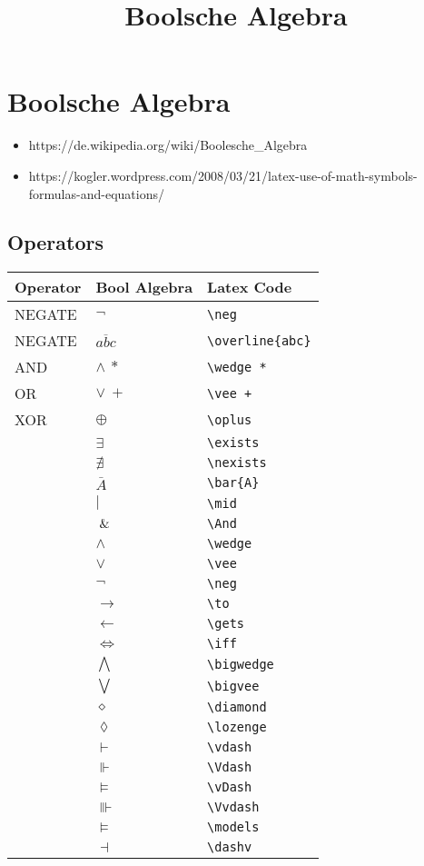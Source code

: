 \documentclass[11pt]{article}
\title{Boolsche Algebra}
\providecommand{\tightlist}{%
      \setlength{\itemsep}{0pt}\setlength{\parskip}{0pt}}
\begin{document}
    
    
    \maketitle
    
    

    
    \section{Boolsche Algebra}\label{boolsche-algebra}

\begin{itemize}
\tightlist
\item
  https://de.wikipedia.org/wiki/Boolesche\_Algebra
\item
  https://kogler.wordpress.com/2008/03/21/latex-use-of-math-symbols-formulas-and-equations/
\end{itemize}

    \subsection{Operators}\label{operators}

    \begin{longtable}[]{@{}lll@{}}
\toprule
Operator & Bool Algebra & Latex Code\tabularnewline
\midrule
\endhead
NEGATE & \(\neg\) & \texttt{\textbackslash{}neg}\tabularnewline
NEGATE & \(\overline{abc}\) &
\texttt{\textbackslash{}overline\{abc\}}\tabularnewline
AND & \(\wedge\:*\) & \texttt{\textbackslash{}wedge\ *}\tabularnewline
OR & \(\vee\:+\) & \texttt{\textbackslash{}vee\ +}\tabularnewline
XOR & \(\oplus\) & \texttt{\textbackslash{}oplus}\tabularnewline
& \(\exists\) & \texttt{\textbackslash{}exists}\tabularnewline
& \(\nexists\) & \texttt{\textbackslash{}nexists}\tabularnewline
& \(\bar{A}\) & \texttt{\textbackslash{}bar\{A\}}\tabularnewline
& \(\mid\) & \texttt{\textbackslash{}mid}\tabularnewline
& \(\And\) & \texttt{\textbackslash{}And}\tabularnewline
& \(\wedge\) & \texttt{\textbackslash{}wedge}\tabularnewline
& \(\vee\) & \texttt{\textbackslash{}vee}\tabularnewline
& \(\neg\) & \texttt{\textbackslash{}neg}\tabularnewline
& \(\to\) & \texttt{\textbackslash{}to}\tabularnewline
& \(\gets\) & \texttt{\textbackslash{}gets}\tabularnewline
& \(\iff\) & \texttt{\textbackslash{}iff}\tabularnewline
& \(\bigwedge\) & \texttt{\textbackslash{}bigwedge}\tabularnewline
& \(\bigvee\) & \texttt{\textbackslash{}bigvee}\tabularnewline
& \(\diamond\) & \texttt{\textbackslash{}diamond}\tabularnewline
& \(\lozenge\) & \texttt{\textbackslash{}lozenge}\tabularnewline
& \(\vdash\) & \texttt{\textbackslash{}vdash}\tabularnewline
& \(\Vdash\) & \texttt{\textbackslash{}Vdash}\tabularnewline
& \(\vDash\) & \texttt{\textbackslash{}vDash}\tabularnewline
& \(\Vvdash\) & \texttt{\textbackslash{}Vvdash}\tabularnewline
& \(\models\) & \texttt{\textbackslash{}models}\tabularnewline
& \(\dashv\) & \texttt{\textbackslash{}dashv}\tabularnewline
\bottomrule
\end{longtable}
\end{document}
